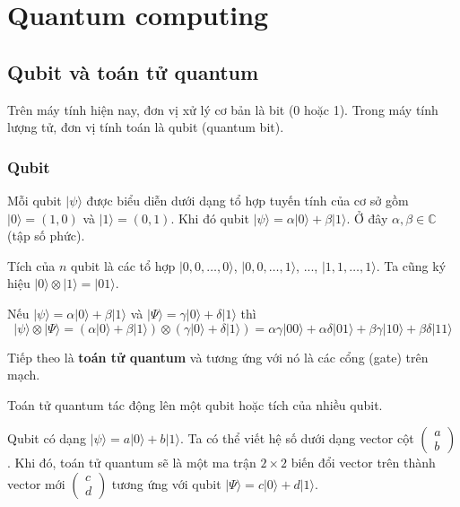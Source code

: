 \chapter{Quantum computing}

\section{Qubit và toán tử quantum}

Trên máy tính hiện nay, đơn vị xử lý cơ bản là bit (0 hoặc 1). Trong máy tính lượng tử, đơn vị tính toán là qubit (quantum bit).

\subsection*{Qubit}

Mỗi qubit $\lvert \psi \rangle$ được biểu diễn dưới dạng tổ hợp tuyến tính của cơ sở gồm $\lvert 0 \rangle = (1, 0)$ và $\lvert 1 \rangle = (0, 1)$. Khi đó qubit $\lvert \psi \rangle = \alpha \lvert 0 \rangle + \beta \lvert 1 \rangle$. Ở đây $\alpha, \beta \in \mathbb{C}$ (tập số phức).

Tích của $n$ qubit là các tổ hợp $\lvert 0, 0, \ldots, 0 \rangle$, $\lvert 0, 0, \ldots, 1 \rangle$, ..., $\lvert 1, 1, \ldots, 1 \rangle$. Ta cũng ký hiệu $\lvert 0 \rangle \otimes \lvert 1 \rangle = \lvert 01 \rangle$. 

\begin{example}
    Nếu $\lvert \psi \rangle = \alpha \lvert 0 \rangle + \beta \lvert 1 \rangle$ và $\lvert \Psi \rangle = \gamma \lvert 0 \rangle + \delta \lvert 1 \rangle$ thì
    \begin{equation*}
        \lvert \psi \rangle \otimes \lvert \Psi \rangle = (\alpha \lvert 0 \rangle + \beta \lvert 1 \rangle) \otimes (\gamma \lvert 0 \rangle + \delta \lvert 1 \rangle) = \alpha \gamma \lvert 00 \rangle + \alpha \delta \lvert 0 1 \rangle + \beta \gamma \lvert 10 \rangle + \beta \delta \lvert 11 \rangle
    \end{equation*}
\end{example}

Tiếp theo là \textbf{toán tử quantum} và tương ứng với nó là các cổng (gate) trên mạch.

Toán tử quantum tác động lên một qubit hoặc tích của nhiều qubit.

Qubit có dạng $\lvert \psi \rangle = a \lvert 0 \rangle + b \lvert 1 \rangle$. Ta có thể viết hệ số dưới dạng vector cột $\begin{pmatrix} a \\ b \end{pmatrix}$. Khi đó, toán tử quantum sẽ là một ma trận $2 \times 2$ biến đổi vector trên thành vector mới $\begin{pmatrix} c \\ d \end{pmatrix}$ tương ứng với qubit $\lvert \Psi \rangle = c \lvert 0 \rangle + d \lvert 1 \rangle$.

